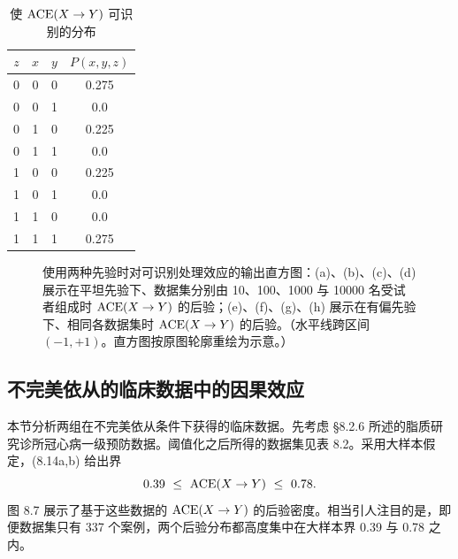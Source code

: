\begin{table}[htbp]
\centering
\caption{使 $\mathrm{ACE}(X\to Y)$ 可识别的分布}
\label{tab:8.1}
\small
\begin{tabular}{cccc}
\toprule
$z$ & $x$ & $y$ & $P(x,y,z)$ \\
\midrule
0 & 0 & 0 & 0.275 \\
0 & 0 & 1 & 0.0 \\
0 & 1 & 0 & 0.225 \\
0 & 1 & 1 & 0.0 \\
1 & 0 & 0 & 0.225 \\
1 & 0 & 1 & 0.0 \\
1 & 1 & 0 & 0.0 \\
1 & 1 & 1 & 0.275 \\
\bottomrule
\end{tabular}
\end{table}

\begin{figure}[htbp]
\centering
{}
\caption{使用两种先验时对可识别处理效应的输出直方图：(a)、(b)、(c)、(d) 展示在平坦先验下、数据集分别由 10、100、1000 与 10000 名受试者组成时 $\mathrm{ACE}(X\to Y)$ 的后验；(e)、(f)、(g)、(h) 展示在有偏先验下、相同各数据集时 $\mathrm{ACE}(X\to Y)$ 的后验。（水平线跨区间 $(-1,+1)$。直方图按原图轮廓重绘为示意。）}
\label{fig:8.6}
\end{figure}

\subsection{不完美依从的临床数据中的因果效应}

本节分析两组在不完美依从条件下获得的临床数据。先考虑 \S 8.2.6 所述的脂质研究诊所冠心病一级预防数据。阈值化之后所得的数据集见表 8.2。采用大样本假定，\textup{(8.14a,b)} 给出界
\[
0.39\ \le\ \mathrm{ACE}(X\to Y)\ \le\ 0.78.
\]
图 8.7 展示了基于这些数据的 $\mathrm{ACE}(X\to Y)$ 的后验密度。相当引人注目的是，即便数据集只有 337 个案例，两个后验分布都高度集中在大样本界 0.39 与 0.78 之内。

